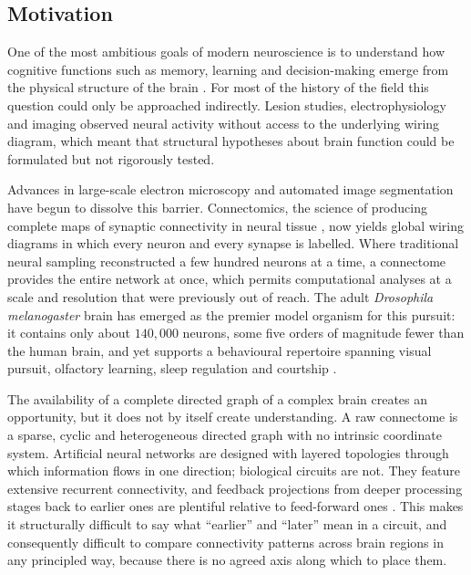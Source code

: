 \documentclass[12pt,a4paper,oneside]{article}
\theoremstyle{definition}
\theoremstyle{plain}
\newcommand{\Drosophila}{\textit{Drosophila melanogaster}}
\begin{document}
\subsection{Motivation}
\label{sec:motivation}

One of the most ambitious goals of modern neuroscience is to understand how
cognitive functions such as memory, learning and decision-making emerge from
the physical structure of the brain \cite{bassett2017}. For most of the
history of the field this question could only be approached indirectly.
Lesion studies, electrophysiology and imaging observed neural activity
without access to the underlying wiring diagram, which meant that structural
hypotheses about brain function could be formulated but not rigorously
tested.

Advances in large-scale electron microscopy and automated image segmentation
have begun to dissolve this barrier. Connectomics, the science of producing
complete maps of synaptic connectivity in neural tissue \cite{bullmore2009},
now yields global wiring diagrams in which every neuron and every synapse is
labelled. Where traditional neural sampling reconstructed a few hundred
neurons at a time, a connectome provides the entire network at once, which
permits computational analyses at a scale and resolution that were
previously out of reach. The adult \Drosophila{} brain has emerged as the
premier model organism for this pursuit: it contains only about
$140{,}000$ neurons, some five orders of magnitude fewer than the human
brain, and yet supports a behavioural repertoire spanning visual pursuit,
olfactory learning, sleep regulation and courtship \cite{lin2024}.

The availability of a complete directed graph of a complex brain creates an
opportunity, but it does not by itself create understanding. A raw
connectome is a sparse, cyclic and heterogeneous directed graph with no
intrinsic coordinate system. Artificial neural networks are designed with
layered topologies through which information flows in one direction;
biological circuits are not. They feature extensive recurrent connectivity,
and feedback projections from deeper processing stages back to earlier ones
are plentiful relative to feed-forward ones \cite{winding2023}. This makes
it structurally difficult to say what ``earlier'' and ``later'' mean in a
circuit, and consequently difficult to compare connectivity patterns across
brain regions in any principled way, because there is no agreed axis along
which to place them.
\end{document}
